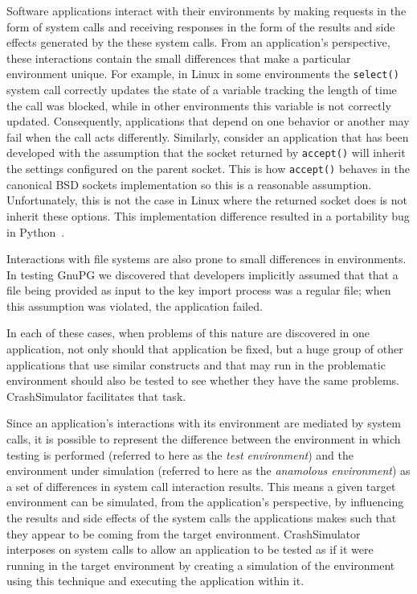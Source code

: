 Software applications interact with their environments by making requests in the form of system calls and receiving
responses in the form of the results and side effects generated by the these system calls.  From an application's
perspective, these interactions contain the small differences that make a particular environment unique.  For example,
in Linux in some environments the {\tt select()} system call correctly updates the state of a variable tracking the
length of time the call was blocked, while in other environments this variable is not correctly updated.  Consequently,
applications that depend on one behavior or another may fail when the call acts differently. Similarly, consider an
application that has been developed with the assumption that the socket returned by {\tt accept()} will inherit the
settings configured on the parent socket.  This is how {\tt accept()} behaves in the canonical BSD sockets
implementation so this is a reasonable assumption.  Unfortunately, this is not the case in Linux
where the returned socket does is not inherit these options.  This implementation difference resulted in a portability
bug in Python~\cite{Zhuang_NSDI_2014}.

Interactions with file systems are also prone to small differences in environments.
In testing GnuPG we discovered that developers implicitly assumed that that a file being provided as input to the key
import process was a regular file; when this assumption was violated, the application failed.

In each of these cases, when problems of this nature are discovered in one application, not only should that application
be fixed, but a huge group of other applications that use similar constructs and that may run in the problematic
environment should also be tested to see whether they have the same problems. CrashSimulator facilitates that task.

Since an application's interactions with its environment are mediated by system calls,
it is possible to represent the difference between the environment in which testing is performed (referred to here
as the {\em test environment}) and the environment under simulation (referred to here as the {\em anamolous environment})
as a set of differences in system call interaction results. 
This means
a given target environment can be simulated, from the application's perspective, by influencing the results and side
effects of the system calls the applications makes such that they appear to be coming from the target environment.
CrashSimulator interposes on system calls to allow an application to
be tested as if it were running in the target environment by creating a simulation of
the environment using this technique and executing the application within it.


